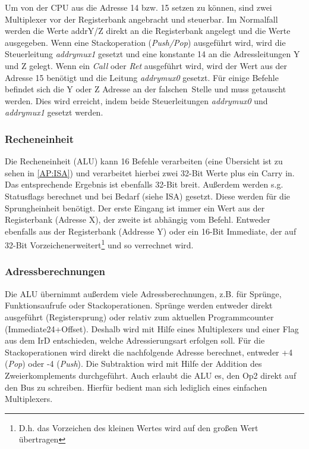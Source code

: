 Um von der CPU aus die Adresse 14 bzw. 15 setzen zu können, sind zwei Multiplexer vor der Registerbank angebracht und steuerbar. Im Normalfall werden die Werte addrY/Z direkt an die Registerbank angelegt und die Werte ausgegeben. Wenn eine Stackoperation (\emph{Push/Pop}) ausgeführt wird, wird die Steuerleitung \textit{addrymux1} gesetzt und eine konstante 14 an die Adressleitungen Y und Z gelegt. Wenn ein \emph{Call} oder \emph{Ret} ausgeführt wird, wird der Wert aus der Adresse 15 benötigt und die Leitung \textit{addrymux0} gesetzt. Für einige Befehle befindet sich die Y oder Z Adresse an der \glqq falschen\grqq \ Stelle und muss getauscht werden. Dies wird erreicht, indem beide Steuerleitungen \textit{addrymux0} und \textit{addrymux1} gesetzt werden.

\subsubsection{Recheneinheit}
Die Recheneinheit (ALU) kann 16 Befehle verarbeiten (eine Übersicht ist zu sehen in \autoref{AP:ISA}) und verarbeitet hierbei zwei 32-Bit Werte plus ein Carry in. Das entsprechende Ergebnis ist ebenfalls 32-Bit breit. Außerdem werden s.g. Statusflags berechnet und bei Bedarf (siehe ISA) gesetzt. Diese werden für die Sprungheinheit benötigt. Der erste Eingang ist immer ein Wert aus der Registerbank (Adresse X), der zweite ist abhängig vom Befehl. Entweder ebenfalls aus der Registerbank (Addresse Y) oder ein 16-Bit Immediate, der auf 32-Bit \glqq Vorzeichenerweitert\grqq \footnote{D.h. das Vorzeichen des kleinen Wertes wird auf den großen Wert übertragen} und so verrechnet wird.

\subsubsection{Adressberechnungen}
Die ALU übernimmt außerdem viele Adressberechnungen, z.B. für Sprünge, Funktionsaufrufe oder Stackoperationen.
Sprünge werden entweder direkt ausgeführt (Registersprung) oder relativ zum aktuellen Programmcounter (Immediate24+Offset). Deshalb wird mit Hilfe eines Multiplexers und einer Flag aus dem IrD entschieden, welche Adressierungsart erfolgen soll.
Für die Stackoperationen wird direkt die nachfolgende Adresse berechnet, entweder +4 (\emph{Pop}) oder -4 (\emph{Push}). Die Subtraktion wird mit Hilfe der Addition des Zweierkomplements durchgeführt.
Auch erlaubt die ALU es, den Op2 direkt auf den Bus zu schreiben. Hierfür bedient man sich lediglich eines einfachen Multiplexers.

